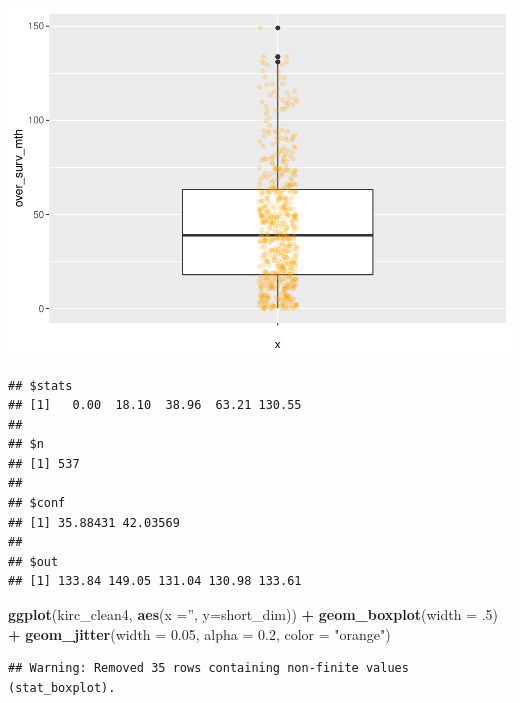\documentclass[]{article}
\newenvironment{Shaded}{\begin{snugshade}}{\end{snugshade}}
\newcommand{\KeywordTok}[1]{\textcolor[rgb]{0.13,0.29,0.53}{\textbf{#1}}}
\newcommand{\DataTypeTok}[1]{\textcolor[rgb]{0.13,0.29,0.53}{#1}}
\newcommand{\DecValTok}[1]{\textcolor[rgb]{0.00,0.00,0.81}{#1}}
\newcommand{\FloatTok}[1]{\textcolor[rgb]{0.00,0.00,0.81}{#1}}
\newcommand{\StringTok}[1]{\textcolor[rgb]{0.31,0.60,0.02}{#1}}
\newcommand{\OperatorTok}[1]{\textcolor[rgb]{0.81,0.36,0.00}{\textbf{#1}}}
\newcommand{\NormalTok}[1]{#1}
\begin{document}
\includegraphics{figs/render-unnamed-chunk-21-1.pdf}

\begin{Shaded}
\end{Shaded}

\begin{verbatim}
## $stats
## [1]   0.00  18.10  38.96  63.21 130.55
## 
## $n
## [1] 537
## 
## $conf
## [1] 35.88431 42.03569
## 
## $out
## [1] 133.84 149.05 131.04 130.98 133.61
\end{verbatim}

\begin{Shaded}
\begin{Highlighting}[]
\KeywordTok{ggplot}\NormalTok{(kirc_clean4, }\KeywordTok{aes}\NormalTok{(}\DataTypeTok{x =}\StringTok{''}\NormalTok{, }\DataTypeTok{y=}\NormalTok{short_dim)) }\OperatorTok{+}
\StringTok{     }\KeywordTok{geom_boxplot}\NormalTok{(}\DataTypeTok{width =}\NormalTok{ .}\DecValTok{5}\NormalTok{) }\OperatorTok{+}
\StringTok{     }\KeywordTok{geom_jitter}\NormalTok{(}\DataTypeTok{width =} \FloatTok{0.05}\NormalTok{, }\DataTypeTok{alpha =} \FloatTok{0.2}\NormalTok{, }\DataTypeTok{color =} \StringTok{"orange"}\NormalTok{)}
\end{Highlighting}
\end{Shaded}

\begin{verbatim}
## Warning: Removed 35 rows containing non-finite values (stat_boxplot).
\end{verbatim}
\end{document}
